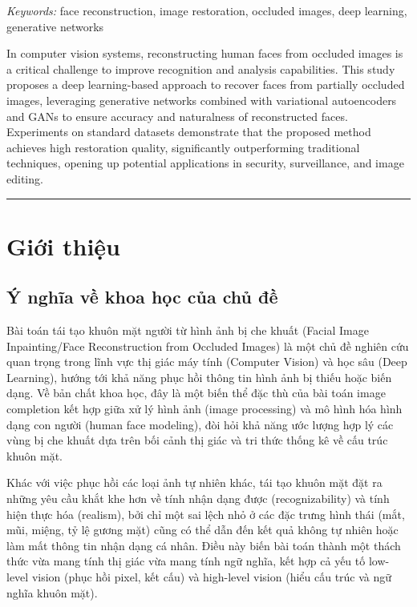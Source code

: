 \documentclass[12pt,a4paper]{article}
\begin{document}
\noindent
\begin{minipage}[t]{0.48\textwidth}
	\textit{Keywords:} face reconstruction, image restoration, occluded images, deep learning, generative networks
\end{minipage}
\hfill
\begin{minipage}[t]{0.48\textwidth}
	In computer vision systems, reconstructing human faces from occluded images is a critical challenge to improve recognition and analysis capabilities. This study proposes a deep learning-based approach to recover faces from partially occluded images, leveraging generative networks combined with variational autoencoders and GANs to ensure accuracy and naturalness of reconstructed faces. Experiments on standard datasets demonstrate that the proposed method achieves high restoration quality, significantly outperforming traditional techniques, opening up potential applications in security, surveillance, and image editing.
\end{minipage}

\vspace{0.2em}
\noindent\rule{\textwidth}{0.6pt}

	
	
	\section{Giới thiệu}
	\subsection{Ý nghĩa về khoa học của chủ đề}
	Bài toán tái tạo khuôn mặt người từ hình ảnh bị che khuất (Facial Image Inpainting/Face Reconstruction from Occluded Images) là một chủ đề nghiên cứu quan trọng trong lĩnh vực thị giác máy tính (Computer Vision) và học sâu (Deep Learning), hướng tới khả năng phục hồi thông tin hình ảnh bị thiếu hoặc biến dạng. Về bản chất khoa học, đây là một biến thể đặc thù của bài toán image completion kết hợp giữa xử lý hình ảnh (image processing) và mô hình hóa hình dạng con người (human face modeling), đòi hỏi khả năng ước lượng hợp lý các vùng bị che khuất dựa trên bối cảnh thị giác và tri thức thống kê về cấu trúc khuôn mặt.
	
	Khác với việc phục hồi các loại ảnh tự nhiên khác, tái tạo khuôn mặt đặt ra những yêu cầu khắt khe hơn về tính nhận dạng được (recognizability) và tính hiện thực hóa (realism), bởi chỉ một sai lệch nhỏ ở các đặc trưng hình thái (mắt, mũi, miệng, tỷ lệ gương mặt) cũng có thể dẫn đến kết quả không tự nhiên hoặc làm mất thông tin nhận dạng cá nhân. Điều này biến bài toán thành một thách thức vừa mang tính thị giác vừa mang tính ngữ nghĩa, kết hợp cả yếu tố low-level vision (phục hồi pixel, kết cấu) và high-level vision (hiểu cấu trúc và ngữ nghĩa khuôn mặt).
	
\end{document}
